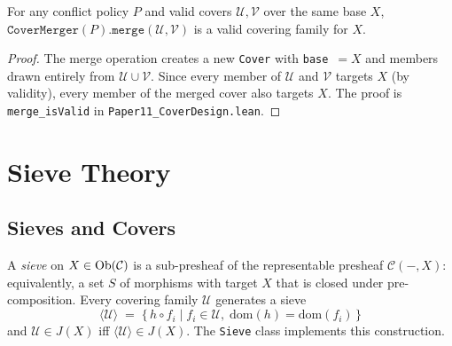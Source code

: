 \documentclass[11pt]{article}
\begin{document}
\begin{proposition}
\label{prop:merge-valid}
For any conflict policy $P$ and valid covers $\mathcal{U}, \mathcal{V}$
over the same base $X$,
$\texttt{CoverMerger}(P).\texttt{merge}(\mathcal{U}, \mathcal{V})$ is a
valid covering family for $X$.
\end{proposition}

\begin{proof}
The merge operation creates a new \texttt{Cover} with
\texttt{base}~$= X$ and members drawn entirely from $\mathcal{U} \cup
\mathcal{V}$.  Since every member of $\mathcal{U}$ and $\mathcal{V}$
targets $X$ (by validity), every member of the merged cover also
targets $X$.  The \LEAN{} proof is \texttt{merge\_isValid}
in \texttt{Paper11\_CoverDesign.lean}.
\end{proof}

\section{Sieve Theory}\label{sec:sieves}

\subsection{Sieves and Covers}

A \emph{sieve} on $X \in \mathrm{Ob}(\mathcal{C})$ is a sub-presheaf of the
representable presheaf $\mathcal{C}(-,X)$: equivalently, a set $S$ of
morphisms with target $X$ that is closed under pre-composition.
Every covering family $\mathcal{U}$ generates a sieve
\[
  \langle \mathcal{U} \rangle
  \;=\;
  \bigl\{\, h \circ f_i \;\big|\; f_i \in \mathcal{U},\;
    \mathrm{dom}(h) = \mathrm{dom}(f_i) \,\bigr\}
\]
and $\mathcal{U} \in J(X)$ iff $\langle \mathcal{U} \rangle \in J(X)$.
The \texttt{Sieve} class implements this construction.
\end{document}
